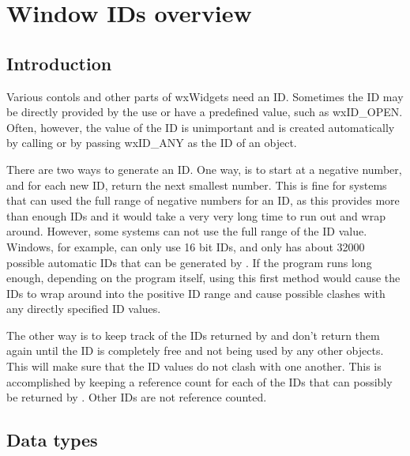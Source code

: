 \section{Window IDs overview}\label{windowidsoverview}



\subsection{Introduction}\label{windowidsoverviewintro}

Various contols and other parts of wxWidgets need an ID.  Sometimes the
ID may be directly provided by the use or have a predefined value, such as
wxID_OPEN.  Often, however, the value of the ID is unimportant and is created
automatically by calling 
or by passing wxID_ANY as the ID of an object.

There are two ways to generate an ID.  One way, is to start at a negative number,
and for each new ID, return the next smallest number.  This is fine for systems
that can used the full range of negative numbers for an ID, as this provides
more than enough IDs and it would take a very very long time to run out and
wrap around.  However, some systems can not use the full range of the ID value.
Windows, for example, can only use 16 bit IDs, and only has about 32000 possible
automatic IDs that can be generated by .
If the program runs long enough, depending on the program itself, using this first
method would cause the IDs to wrap around into the positive ID range and cause possible
clashes with any directly specified ID values.

The other way is to keep track of the IDs returned by 
and don't return them again until the ID is completely free and not being used by
any other objects.  This will make sure that the ID values do not clash with one
another.  This is accomplished by keeping a reference count for each of the IDs
that can possibly be returned by .
Other IDs are not reference counted.

\subsection{Data types}\label{windowidsoverviewtypes}


